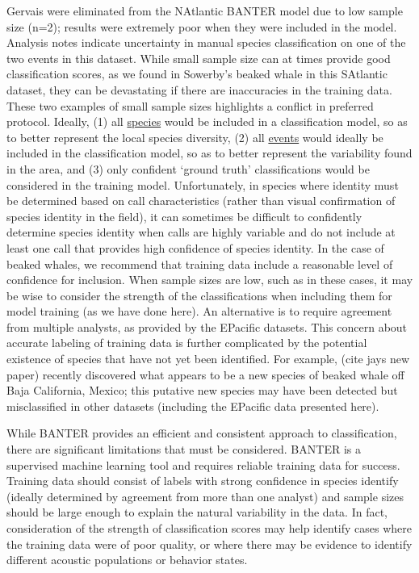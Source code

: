 \documentclass[
  letterpaper,
  DIV=11,
  numbers=noendperiod]{scrartcl}
\begin{document}
Gervais were eliminated from the NAtlantic BANTER model due to low
sample size (n=2); results were extremely poor when they were included
in the model. Analysis notes indicate uncertainty in manual species
classification on one of the two events in this dataset. While small
sample size can at times provide good classification scores, as we found
in Sowerby's beaked whale in this SAtlantic dataset, they can be
devastating if there are inaccuracies in the training data. These two
examples of small sample sizes highlights a conflict in preferred
protocol. Ideally, (1) all \uline{species} would be included in a
classification model, so as to better represent the local species
diversity, (2) all \uline{events} would ideally be included in the
classification model, so as to better represent the variability found in
the area, and (3) only confident `ground truth' classifications would be
considered in the training model. Unfortunately, in species where
identity must be determined based on call characteristics (rather than
visual confirmation of species identity in the field), it can sometimes
be difficult to confidently determine species identity when calls are
highly variable and do not include at least one call that provides high
confidence of species identity. In the case of beaked whales, we
recommend that training data include a reasonable level of confidence
for inclusion. When sample sizes are low, such as in these cases, it may
be wise to consider the strength of the classifications when including
them for model training (as we have done here). An alternative is to
require agreement from multiple analysts, as provided by the EPacific
datasets. This concern about accurate labeling of training data is
further complicated by the potential existence of species that have not
yet been identified. For example, (cite jays new paper) recently
discovered what appears to be a new species of beaked whale off Baja
California, Mexico; this putative new species may have been detected but
misclassified in other datasets (including the EPacific data presented
here).

While BANTER provides an efficient and consistent approach to
classification, there are significant limitations that must be
considered. BANTER is a supervised machine learning tool and requires
reliable training data for success. Training data should consist of
labels with strong confidence in species identify (ideally determined by
agreement from more than one analyst) and sample sizes should be large
enough to explain the natural variability in the data. In fact,
consideration of the strength of classification scores may help identify
cases where the training data were of poor quality, or where there may
be evidence to identify different acoustic populations or behavior
states.
\end{document}
